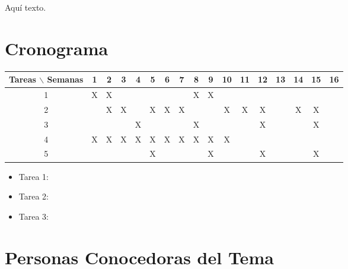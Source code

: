 \documentclass[12pt]{article}
\begin{document}


Aqu\'i texto.

\section{Cronograma}

\begin{table}[htb]
	\begin{tabular}{|c|cccccccccccccccc| }
	\hline
	Tareas $\backslash$ Semanas & 1 & 2 & 3 & 4 & 5 & 6 & 7 & 8 & 9 & 10 & 11 & 12 & 13 & 14 & 15 & 16  \\
	\hline
	1 & X & X &   &   &   &   &   & X & X &   &   &   &   &   &   &   \\
	2 &   & X & X &   & X & X & X &   &   & X & X & X &   & X & X &   \\
	3 &   &   &   & X &   &   &   & X &   &   &   & X &   &   & X &   \\
	4 & X & X & X & X & X & X & X & X & X & X &   &   &   &   &   &   \\
	5 &   &   &   &   & X &   &   &   & X &   &   & X &   &   & X &   \\
	\hline
	\end{tabular}
\end{table}
\vspace{1mm}

\begin{itemize}
	\item Tarea 1:
	\item Tarea 2: 
	\item Tarea 3:
\end{itemize}

\section{Personas Conocedoras del Tema}
\end{document}
